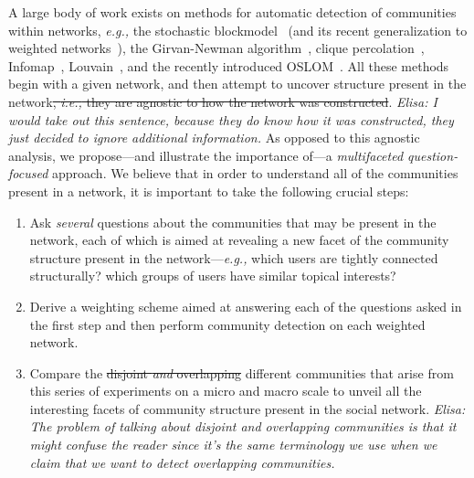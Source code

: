 A large body of work exists on methods for automatic detection of communities within networks, {\it e.g.,} the stochastic blockmodel~\cite{Holland1983} (and its recent generalization to weighted networks~\cite{Aicher26062014}), the Girvan-Newman algorithm~\cite{newman2004finding}, clique percolation~\cite{PalEtAl05}, Infomap~\cite{Rosvall08mapsof}, Louvain~\cite{blondel2008fast}, and the recently introduced OSLOM~\cite{LancichinettiPlos}.
All these methods begin with a given network, and then attempt to uncover structure present in the network\sout{, \emph{i.e.,} they are agnostic to how the network was constructed}. \textit{Elisa: I would take out this sentence, because they do know how it was constructed, they just decided to ignore additional information.}
As opposed to this agnostic analysis, we propose---and illustrate the importance of---a \emph{multifaceted question-focused} approach. We believe that in order to understand all of the communities present in a network, it is important to take the following crucial steps: 
\begin{enumerate}

\item Ask \emph{several} questions about the communities that may be present in the network, each of which is aimed at revealing a new facet of the community structure present in the network---{\it e.g.,} which users are tightly connected structurally? which groups of users have similar topical interests?

\item Derive a weighting scheme aimed at answering each of the questions asked in the first step and then perform community detection on each weighted network.
\item Compare the \sout{disjoint \emph{and} overlapping} different communities that arise from this series of experiments on a micro and macro scale to unveil all the interesting facets of community structure present in the social network. \textit{Elisa: The problem of talking about disjoint and overlapping communities is that it might confuse the reader since it's the same terminology we use when we claim that we want to detect overlapping communities.} 
\end{enumerate}

